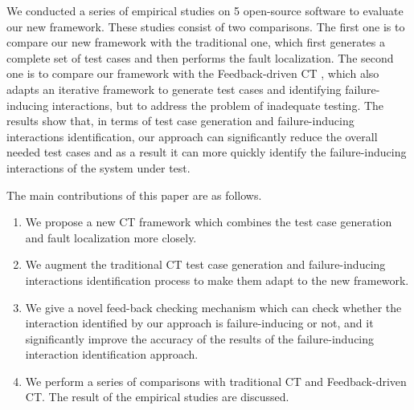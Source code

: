 \documentclass[10pt,journal,compsoc]{IEEEtran}
\begin{document}

%
%
%


We conducted a series of empirical studies on 5 open-source software to evaluate our new framework. These studies consist of two comparisons. The first one is to compare our new framework with the traditional one, which first generates a complete set of test cases and then performs the fault localization. The second one is to compare our framework with the Feedback-driven CT \cite{dumlu2011feedback,yilmaz2013reducing}, which also adapts an iterative framework to generate test cases and identifying failure-inducing interactions, but to address the problem of inadequate testing. The results show that, in terms of test case generation and failure-inducing interactions identification, our approach can significantly reduce the overall needed test cases and as a result it can more quickly identify the failure-inducing interactions of the system under test.

The main contributions of this paper are as follows.

 \begin{enumerate}
 \item  We propose a new CT framework which combines the test case generation and fault localization more closely.
 \item  We augment the traditional CT test case generation and failure-inducing interactions identification process to make them adapt to the new framework.
 \item  We give a novel feed-back checking mechanism which can check whether the interaction identified by our approach is failure-inducing or not, and it significantly improve the accuracy of the results of the failure-inducing interaction identification approach.
 \item We perform a series of comparisons with traditional CT and Feedback-driven CT. The result of the empirical studies are discussed.
\end{enumerate}
\end{document}
